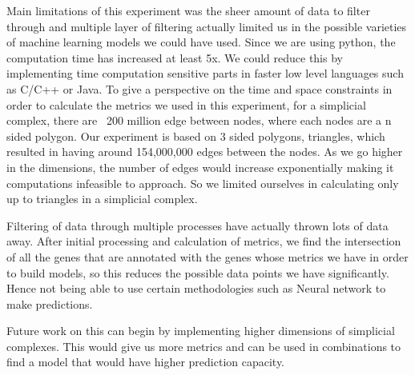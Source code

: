 \documentclass[9pt]{article}
\begin{document}
Main limitations of this experiment was the sheer amount of data to filter through and multiple layer of filtering actually limited us in the possible varieties of machine learning models we could have used. Since we are using python, the computation time has increased at least 5x. We could reduce this by implementing time computation sensitive parts in faster low level languages such as C/C++ or Java. To give a perspective on the time and space constraints in order to calculate the metrics we used in this experiment, for a simplicial complex, there are ~200 million edge between nodes, where each nodes are a n sided polygon. Our experiment is based on 3 sided polygons, triangles, which resulted in having around 154,000,000 edges between the nodes. As we go higher in the dimensions, the number of edges would increase exponentially making it computations infeasible to approach. So we limited ourselves in calculating only up to triangles in a simplicial complex. 

Filtering of data through multiple processes have actually thrown lots of data away. After initial processing and calculation of metrics, we find the intersection of all the genes that are annotated with the genes whose metrics we have in order to build models, so this reduces the possible data points we have significantly. Hence not being able to use certain methodologies such as Neural network to make predictions.

Future work on this can begin by implementing higher dimensions of simplicial complexes. This would give us more metrics and can be used in combinations to find a model that would have higher prediction capacity. 
\end{document}
